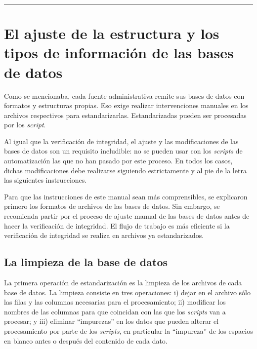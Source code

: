\documentclass[
  spanish,
]{book}
\begin{document}
\begin{center}\rule{0.5\linewidth}{0.5pt}\end{center}

\hypertarget{el-ajuste-de-la-estructura-y-los-tipos-de-informaciuxf3n-de-las-bases-de-datos}{%
\section{El ajuste de la estructura y los tipos de información de las bases de datos}\label{el-ajuste-de-la-estructura-y-los-tipos-de-informaciuxf3n-de-las-bases-de-datos}}

Como se mencionaba, cada fuente administrativa remite sus bases de datos con formatos y estructuras propias. Eso exige realizar intervenciones manuales en los archivos respectivos para estandarizarlas. Estandarizadas pueden ser procesadas por los \emph{script}.

Al igual que la verificación de integridad, el ajuste y las modificaciones de las bases de datos son un requisito ineludible: no se pueden usar con los \emph{scripts} de automatización las que no han pasado por este proceso. En todos los casos, dichas modificaciones debe realizarse siguiendo estrictamente y al pie de la letra las siguientes instrucciones.

Para que las instrucciones de este manual sean más comprensibles, se explicaron primero los formatos de archivos de las bases de datos. Sin embargo, se recomienda partir por el proceso de ajuste manual de las bases de datos antes de hacer la verificación de integridad. El flujo de trabajo es más eficiente si la verificación de integridad se realiza en archivos ya estandarizados.

\hypertarget{la-limpieza-de-la-base-de-datos}{%
\subsection{La limpieza de la base de datos}\label{la-limpieza-de-la-base-de-datos}}

La primera operación de estandarización es la limpieza de los archivos de cada base de datos. La limpieza consiste en tres operaciones: i) dejar en el archivo sólo las filas y las columnas necesarias para el procesamiento; ii) modificar los nombres de las columnas para que coincidan con las que los \emph{scripts} van a procesar; y iii) eliminar ``impurezas'' en los datos que pueden alterar el procesamiento por parte de los \emph{scripts}, en particular la ``impureza'' de los espacios en blanco antes o después del contenido de cada dato.
\end{document}
